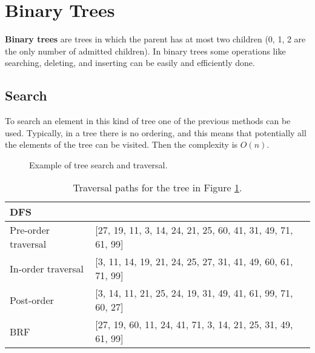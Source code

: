 \section{Binary Trees}
\textbf{Binary trees} are trees in which the parent has at most two children (0, 1, 2 are the only number of admitted children). In binary trees some operations like searching, deleting, and inserting can be easily and efficiently done. 
\subsection{Search}
To search an element in this kind of tree one of the previous methods can be used. Typically, in a tree there is no ordering, and this means that potentially all the elements of the tree can be visited. Then the complexity is \(O(n)\).

\begin{figure}[H]
\centering
{}
\caption[Example of tree search and traversal.]{Example of tree search and traversal.}
\label{trees_12}
\end{figure}

\begin{table}[H]
	\centering
	\begin{tabular}{l  l}
 		 DFS & \\
		\hline
		Pre-order traversal & [27, 19, 11, 3, 14, 24, 21, 25, 60, 41, 31, 49, 71, 61, 99] \\
		In-order traversal & [3, 11, 14, 19, 21, 24, 25, 27, 31, 41, 49, 60, 61, 71, 99] \\
		Post-order & [3, 14, 11, 21, 25, 24, 19, 31, 49, 41, 61, 99, 71, 60, 27] \\
		\hline
		BRF & [27, 19, 60, 11, 24, 41, 71, 3, 14, 21, 25, 31, 49, 61, 99]
	\end{tabular}
\caption[Traversal paths for the tree in Figure \ref{trees_12}.]{Traversal paths for the tree in Figure \ref{trees_12}.}
\end{table}

